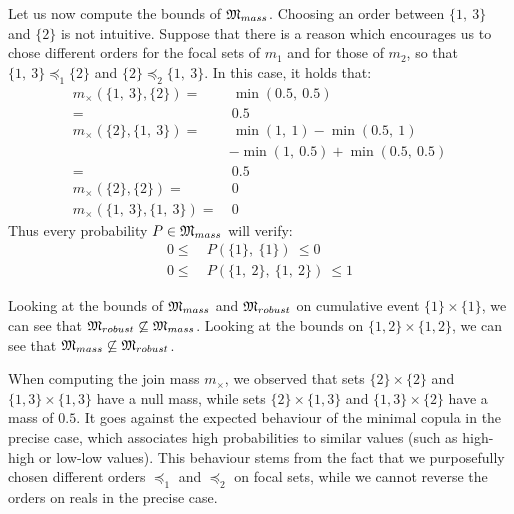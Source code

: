 \begin{example}
    Let us now compute the bounds of ${\mathfrak{M}}_{mass}$. Choosing an order between $\{1, ~3\}$ and $\{2\}$ is not intuitive. Suppose that there is a reason which encourages us to chose different orders for the focal sets of $m_1$ and for those of $m_2$, so that $\{1,~3\} \preceq_1 \{2\}$ and $\{2\} \preceq_2 \{1,~3\}$. In this case, it holds that:
    \begin{align*}
        m_\times(\{1, ~3\}, \{2\}) =& ~\min(0.5, ~0.5)\\
        =& ~0.5\\
        m_\times(\{2\}, \{1, ~3\}) =& ~\min(1, ~1) - \min(0.5, ~1)\\
        & - \min(1, ~0.5) + \min(0.5, ~0.5)\\
        =& ~0.5\\
        m_\times(\{2\}, \{2\}) =& ~0\\
        m_\times(\{1, ~3\}, \{1, ~3\}) =& ~0
    \end{align*}
    Thus every probability $P\in{\mathfrak{M}}_{mass}$ will verify:
    \begin{align*}
        0 \leqslant ~&P(\{1\},~ \{1\})~ \leqslant 0\\
        0 \leqslant ~&P(\{1, ~2\},~ \{1, ~2\})~ \leqslant 1
    \end{align*}
    
    Looking at the bounds of ${\mathfrak{M}}_{mass}$ and ${\mathfrak{M}}_{robust}$ on cumulative event $\{1\}\times\{1\}$, we can see that ${\mathfrak{M}}_{robust}\not\subseteq {\mathfrak{M}}_{mass}$. Looking at the bounds on $\{1,2\}\times\{1,2\}$, we can see that ${\mathfrak{M}}_{mass}\not\subseteq {\mathfrak{M}}_{robust}$.
    
    \begin{remark}
        When computing the join mass $m_\times$, we observed that sets $\{2\}\times\{2\}$ and $\{1, 3\}\times\{1, 3\}$ have a null mass, while sets $\{2\}\times\{1, 3\}$ and $\{1, 3\}\times\{2\}$ have a mass of $0.5$. It goes against the expected behaviour of the minimal copula in the precise case, which associates high probabilities to similar values (such as high-high or low-low values). This behaviour stems from the fact that we purposefully chosen different orders $\preceq_1$ and $\preceq_2$ on focal sets, while we cannot reverse the orders on reals in the precise case.
        

\end{remark}
\end{example}
